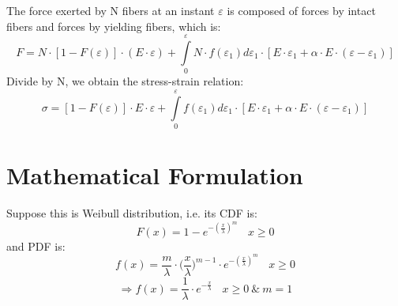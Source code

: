 \documentclass{article}
\begin{document}
The force exerted by N fibers at an instant $\varepsilon$ is composed of forces by
intact fibers and forces by yielding fibers, which is:
\begin{equation}
F = N \cdot [1 - F(\varepsilon)] \cdot (E \cdot \varepsilon) + \int\limits_0^\varepsilon N \cdot f(\varepsilon_1)d\varepsilon_1 \cdot [E \cdot \varepsilon_1 + \alpha \cdot E \cdot (\varepsilon - \varepsilon_1)]
\end{equation}
Divide by N, we obtain the stress-strain relation:
\begin{equation}
\sigma = [1 - F(\varepsilon)] \cdot E \cdot \varepsilon + \int\limits_0^\varepsilon f(\varepsilon_1)d\varepsilon_1 \cdot [E \cdot \varepsilon_1 + \alpha \cdot E \cdot (\varepsilon - \varepsilon_1)]
\end{equation}
 

\section{Mathematical Formulation}

Suppose this is Weibull distribution, i.e. its CDF is:
\begin{equation}
F(x) = 1 - e^{-(\frac{x}{\lambda})^m} ~~~~ x \ge 0
\end{equation}
and PDF is:
\begin{equation}
f(x) = \frac{m}{\lambda} \cdot \bigg(\frac{x}{\lambda}\bigg)^{m-1} \cdot e^{-(\frac{x}{\lambda})^m} ~~~~ x \ge 0    
\end{equation}
\begin{equation}
\Rightarrow f(x) = \frac{1}{\lambda} \cdot e^{-\frac{x}{\lambda}} ~~~~ x \ge 0 ~\&~ m = 1
\end{equation}
\end{document}
